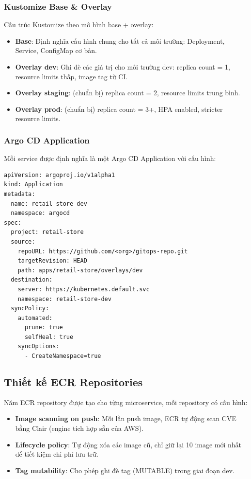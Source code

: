 \documentclass[13pt,a4paper,twoside]{extarticle}
\begin{document}
\subsubsection{Kustomize Base \& Overlay}

Cấu trúc Kustomize theo mô hình base + overlay:

\begin{itemize}[leftmargin=*,nosep]
  \item \textbf{Base}: Định nghĩa cấu hình chung cho tất cả môi trường: Deployment, Service, ConfigMap cơ bản.
  \item \textbf{Overlay dev}: Ghi đè các giá trị cho môi trường dev: replica count = 1, resource limits thấp, image tag từ CI.
  \item \textbf{Overlay staging}: (chuẩn bị) replica count = 2, resource limits trung bình.
  \item \textbf{Overlay prod}: (chuẩn bị) replica count = 3+, HPA enabled, stricter resource limits.
\end{itemize}

\subsubsection{Argo CD Application}

Mỗi service được định nghĩa là một Argo CD Application với cấu hình:

\begin{verbatim}
apiVersion: argoproj.io/v1alpha1
kind: Application
metadata:
  name: retail-store-dev
  namespace: argocd
spec:
  project: retail-store
  source:
    repoURL: https://github.com/<org>/gitops-repo.git
    targetRevision: HEAD
    path: apps/retail-store/overlays/dev
  destination:
    server: https://kubernetes.default.svc
    namespace: retail-store-dev
  syncPolicy:
    automated:
      prune: true
      selfHeal: true
    syncOptions:
      - CreateNamespace=true
\end{verbatim}

\subsection{Thiết kế ECR Repositories}

Năm ECR repository được tạo cho từng microservice, mỗi repository có cấu hình:

\begin{itemize}[leftmargin=*,nosep]
  \item \textbf{Image scanning on push}: Mỗi lần push image, ECR tự động scan CVE bằng Clair (engine tích hợp sẵn của AWS).
  \item \textbf{Lifecycle policy}: Tự động xóa các image cũ, chỉ giữ lại 10 image mới nhất để tiết kiệm chi phí lưu trữ.
  \item \textbf{Tag mutability}: Cho phép ghi đè tag (MUTABLE) trong giai đoạn dev.
\end{itemize}
\end{document}
